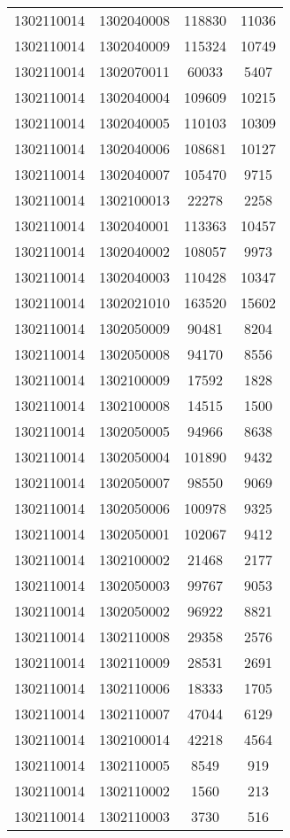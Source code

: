 \begin{longtable}[h]{llcc}
		1302110014 & 1302040008 & 118830 & 11036\\
		1302110014 & 1302040009 & 115324 & 10749\\
		1302110014 & 1302070011 & 60033 & 5407\\
		1302110014 & 1302040004 & 109609 & 10215\\
		1302110014 & 1302040005 & 110103 & 10309\\
		1302110014 & 1302040006 & 108681 & 10127\\
		1302110014 & 1302040007 & 105470 & 9715\\
		1302110014 & 1302100013 & 22278 & 2258\\
		1302110014 & 1302040001 & 113363 & 10457\\
		1302110014 & 1302040002 & 108057 & 9973\\
		1302110014 & 1302040003 & 110428 & 10347\\
		1302110014 & 1302021010 & 163520 & 15602\\
		1302110014 & 1302050009 & 90481 & 8204\\
		1302110014 & 1302050008 & 94170 & 8556\\
		1302110014 & 1302100009 & 17592 & 1828\\
		1302110014 & 1302100008 & 14515 & 1500\\
		1302110014 & 1302050005 & 94966 & 8638\\
		1302110014 & 1302050004 & 101890 & 9432\\
		1302110014 & 1302050007 & 98550 & 9069\\
		1302110014 & 1302050006 & 100978 & 9325\\
		1302110014 & 1302050001 & 102067 & 9412\\
		1302110014 & 1302100002 & 21468 & 2177\\
		1302110014 & 1302050003 & 99767 & 9053\\
		1302110014 & 1302050002 & 96922 & 8821\\
		1302110014 & 1302110008 & 29358 & 2576\\
		1302110014 & 1302110009 & 28531 & 2691\\
		1302110014 & 1302110006 & 18333 & 1705\\
		1302110014 & 1302110007 & 47044 & 6129\\
		1302110014 & 1302100014 & 42218 & 4564\\
		1302110014 & 1302110005 & 8549 & 919\\
		1302110014 & 1302110002 & 1560 & 213\\
		1302110014 & 1302110003 & 3730 & 516\\

\end{longtable}

